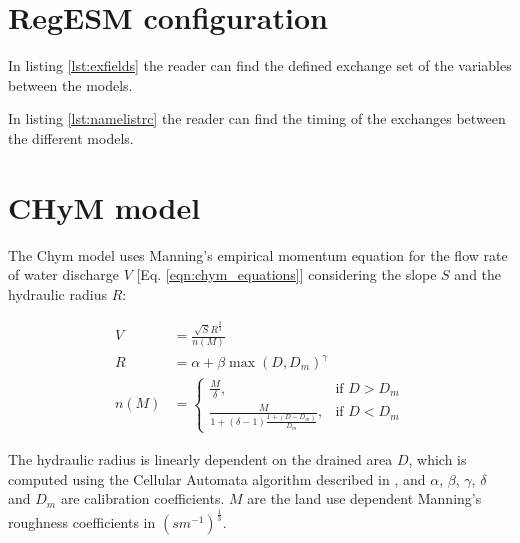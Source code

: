 \documentclass[journal abbreviation, manuscript]{copernicus}
\begin{document}




\appendix
\section{RegESM configuration}
\label{appendix:regesm}
In listing \ref{lst:exfields} the reader can find the defined exchange
set of the variables between the models.



In listing \ref{lst:namelistrc} the reader can find the timing of the
exchanges between the different models.



\section{CHyM model}
\label{appendix:chym}

The Chym model uses Manning's empirical momentum equation \citep{manning-1891}
for the flow rate of water discharge $V$ [Eq. \ref{eqn:chym_equations}]
considering the slope $S$ and the hydraulic radius $R$:

\begin{align}
    \label{eqn:chym_equations}
    V &= \frac{\sqrt{S} R^{\frac{2}{3}}}{n(M)} \\
    R &= \alpha + \beta \max(D,D_{m})^{\gamma} \\
    n(M) &= \begin{cases}
      \frac{M}{\delta}, & \text{if } D > D_{m} \\
      \frac{M}{1+(\delta-1) \frac{1+(D-D_{m})}{D_{m}}}, & \text{if } D < D_{m}
    \end{cases}
\end{align}

The hydraulic radius is linearly dependent on the drained area $D$, which
is computed using the Cellular Automata algorithm described in
\cite{coppola-2007}, and $\alpha$, $\beta$, $\gamma$, $\delta$ and $D_{m}$ are
calibration coefficients.
$M$ are the land use dependent Manning's roughness coefficients in
$(s m^{-1})^{\frac{1}{3}}$.


\end{document}
